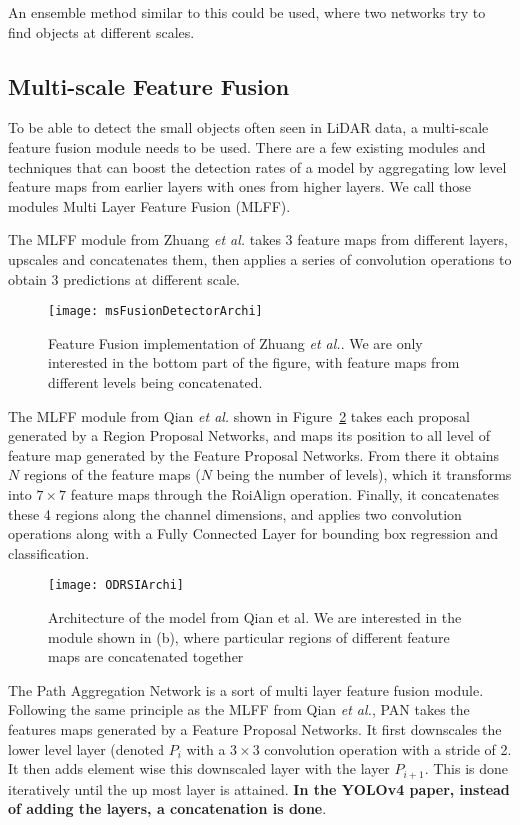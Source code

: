 An ensemble method similar to this could be used, where two networks try to find objects at different scales.

\subsection{Multi-scale Feature Fusion}
To be able to detect the small objects often seen in LiDAR data, a multi-scale feature fusion module needs to be used. There are a few existing modules and techniques that can boost the detection rates of a model by aggregating low level feature maps from earlier layers with ones from higher layers. We call those modules Multi Layer Feature Fusion (MLFF). 

The MLFF module from Zhuang \textit{et al.}\cite{zhuang2019} takes 3 feature maps from different layers, upscales and concatenates them, then applies a series of convolution operations to obtain 3 predictions at different scale.

\begin{figure}[H]
  \centering
  \texttt{[image: msFusionDetectorArchi]}
	\caption[]{Feature Fusion implementation of Zhuang \textit{et al.}. We are only interested in the bottom part of the figure, with feature maps from different levels being concatenated.}
  \label{fig:mlffZhuang}
\end{figure}

The MLFF module from Qian \textit{et al.}\cite{qianAl} shown in Figure~\ref{fig:mlffQian} takes each proposal generated by a Region Proposal Networks, and maps its position to all level of feature map generated by the Feature Proposal Networks. From there it obtains $N$ regions of the feature maps ($N$ being the number of levels), which it transforms into $7 \times 7$ feature maps through the RoiAlign\cite{maskRCNN} operation. Finally, it concatenates these 4 regions along the channel dimensions, and applies two convolution operations along with a Fully Connected Layer for bounding box regression and classification.

\begin{figure}[H]
  \centering
  \texttt{[image: ODRSIArchi]}
	\caption[]{Architecture of the model from Qian et al. We are interested in the module shown in (b), where particular regions of different feature maps are concatenated together}
  \label{fig:mlffQian}
\end{figure}

The Path Aggregation Network is a sort of multi layer feature fusion module. Following the same principle as the MLFF from Qian \textit{et al.}, PAN takes the features maps generated by a Feature Proposal Networks. It first downscales the lower level layer (denoted $P_i$ with a $3 \times 3$ convolution operation with a stride of 2. It then adds element wise this downscaled layer with the layer $P_{i+1}$. This is done iteratively until the up most layer is attained. \textbf{In the YOLOv4 paper, instead of adding the layers, a concatenation is done}.

